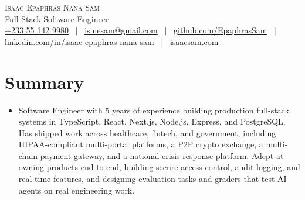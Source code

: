 \documentclass[letterpaper,11pt]{article}
\newcommand{\resumeItem}[1]{
  \item\small{
    {#1 \vspace{0pt}}
  }
}
\newcommand{\resumeSubHeadingListStart}{\begin{itemize}[leftmargin=0.0in, label={}]}
\newcommand{\resumeSubHeadingListEnd}{\end{itemize}\vspace{0pt}}
\begin{document}
\begin{center}
    {\Large \scshape Isaac Epaphras Nana Sam} \\[1mm]
    {\small Full-Stack Software Engineer} \\[2mm]
    \footnotesize
    \underline{+233 55 142 9980} ~$|$~
    \underline{isinesam@gmail.com} ~$|$~
    \href{https://github.com/EpaphrasSam}{github.com/EpaphrasSam} ~$|$~
    \href{https://www.linkedin.com/in/isaac-epaphras-nana-sam/}{linkedin.com/in/isaac-epaphras-nana-sam} ~$|$~
    \href{https://isaacsam.com}{isaacsam.com}
    \vspace{8pt}
\end{center}

\section{Summary}
\resumeSubHeadingListStart
\resumeItem{Software Engineer with 5 years of experience building production full-stack systems in TypeScript, React, Next.js, Node.js, Express, and PostgreSQL. Has shipped work across healthcare, fintech, and government, including HIPAA-compliant multi-portal platforms, a P2P crypto exchange, a multi-chain payment gateway, and a national crisis response platform. Adept at owning products end to end, building secure access control, audit logging, and real-time features, and designing evaluation tasks and graders that test AI agents on real engineering work.}
\resumeSubHeadingListEnd
\vspace{-1pt}

\end{document}
